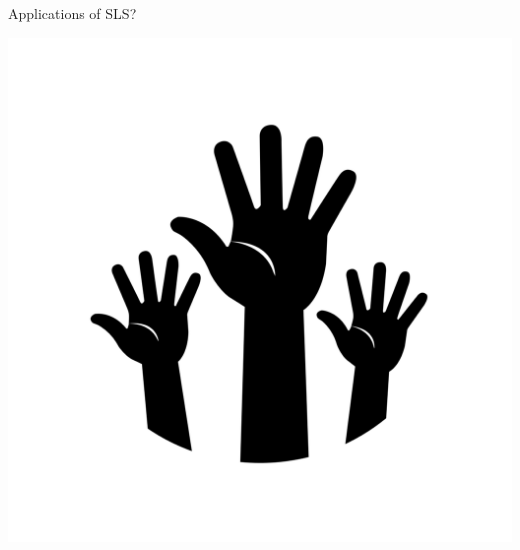 \begin{frame}[c]{Applications of SLS?}

\centering
\includegraphics[scale=.1]{images/hands.png}

\end{frame}
